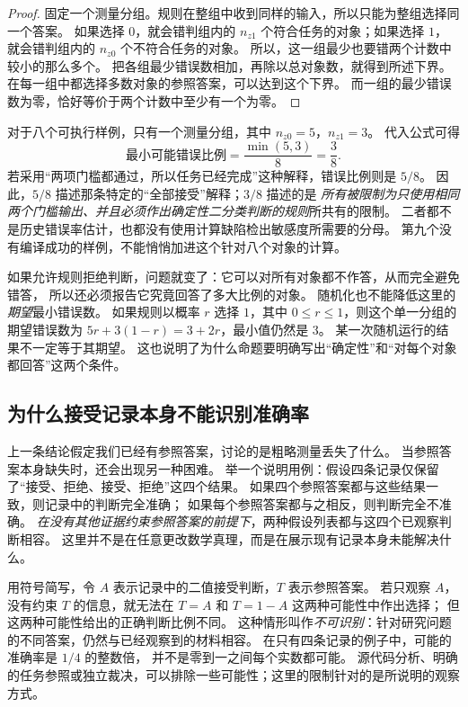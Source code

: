 \begin{proof}
固定一个测量分组。规则在整组中收到同样的输入，所以只能为整组选择同一个答案。
如果选择 $0$，就会错判组内的 $n_{z1}$ 个符合任务的对象；如果选择 $1$，
就会错判组内的 $n_{z0}$ 个不符合任务的对象。
所以，这一组最少也要错两个计数中较小的那么多个。
把各组最少错误数相加，再除以总对象数，就得到所述下界。
在每一组中都选择多数对象的参照答案，可以达到这个下界。
而一组的最少错误数为零，恰好等价于两个计数中至少有一个为零。
\end{proof}

对于八个可执行样例，只有一个测量分组，其中 $n_{z0}=5$，$n_{z1}=3$。
代入公式可得
\[
\text{最小可能错误比例}=\frac{\min(5,3)}8=\frac38.
\]
若采用“两项门槛都通过，所以任务已经完成”这种解释，错误比例则是 $5/8$。
因此，$5/8$ 描述那条特定的“全部接受”解释；$3/8$ 描述的是
\emph{所有被限制为只使用相同两个门槛输出、并且必须作出确定性二分类判断的规则}所共有的限制。
二者都不是历史错误率估计，也都没有使用计算缺陷检出敏感度所需要的分母。
第九个没有编译成功的样例，不能悄悄加进这个针对八个对象的计算。

如果允许规则拒绝判断，问题就变了：它可以对所有对象都不作答，从而完全避免错答，
所以还必须报告它究竟回答了多大比例的对象。
随机化也不能降低这里的\emph{期望}最小错误数。
如果规则以概率 $r$ 选择 $1$，其中 $0\le r\le1$，则这个单一分组的期望错误数为
$5r+3(1-r)=3+2r$，最小值仍然是 $3$。
某一次随机运行的结果不一定等于其期望。
这也说明了为什么命题要明确写出“确定性”和“对每个对象都回答”这两个条件。

\subsection{为什么接受记录本身不能识别准确率}
\label{subsec:accuracy}

上一条结论假定我们已经有参照答案，讨论的是粗略测量丢失了什么。
当参照答案本身缺失时，还会出现另一种困难。
举一个说明用例：假设四条记录仅保留了“接受、拒绝、接受、拒绝”这四个结果。
如果四个参照答案都与这些结果一致，则记录中的判断完全准确；
如果每个参照答案都与之相反，则判断完全不准确。
\emph{在没有其他证据约束参照答案的前提下}，两种假设列表都与这四个已观察判断相容。
这里并不是在任意更改数学真理，而是在展示现有记录本身未能解决什么。

用符号简写，令 $A$ 表示记录中的二值接受判断，$T$ 表示参照答案。
若只观察 $A$，没有约束 $T$ 的信息，就无法在 $T=A$ 和 $T=1-A$ 这两种可能性中作出选择；
但这两种可能性给出的正确判断比例不同。
这种情形叫作\emph{不可识别}：针对研究问题的不同答案，仍然与已经观察到的材料相容。
在只有四条记录的例子中，可能的准确率是 $1/4$ 的整数倍，
并不是零到一之间每个实数都可能。
源代码分析、明确的任务参照或独立裁决，可以排除一些可能性；这里的限制针对的是所说明的观察方式。

